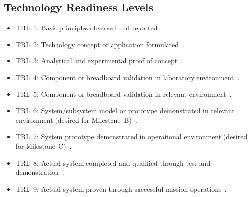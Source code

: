\documentclass[../main.tex]{subfiles}
\begin{document}
\subsection{Technology Readiness Levels}
\begin{itemize}
  \item TRL~1: Basic principles observed and reported~\autocite{edo-3-3-4-research-development-2025,USDRE-TRA-2025}.
  \item TRL~2: Technology concept or application formulated~\autocite{edo-3-3-4-research-development-2025,USDRE-TRA-2025}.
  \item TRL~3: Analytical and experimental proof of concept~\autocite{edo-3-3-4-research-development-2025,USDRE-TRA-2025}.
  \item TRL~4: Component or breadboard validation in laboratory environment~\autocite{edo-3-3-4-research-development-2025,USDRE-TRA-2025}.
  \item TRL~5: Component or breadboard validation in relevant environment~\autocite{edo-3-3-4-research-development-2025,USDRE-TRA-2025}.
  \item TRL~6: System/subsystem model or prototype demonstrated in relevant environment (desired for Milestone~B)~\autocite{edo-3-3-4-research-development-2025,USDRE-TRA-2025}.
  \item TRL~7: System prototype demonstrated in operational environment (desired for Milestone~C)~\autocite{edo-3-3-4-research-development-2025,USDRE-TRA-2025}.
  \item TRL~8: Actual system completed and qualified through test and demonstration~\autocite{edo-3-3-4-research-development-2025,USDRE-TRA-2025}.
  \item TRL~9: Actual system proven through successful mission operations~\autocite{edo-3-3-4-research-development-2025,USDRE-TRA-2025}.
\end{itemize}
\end{document}
